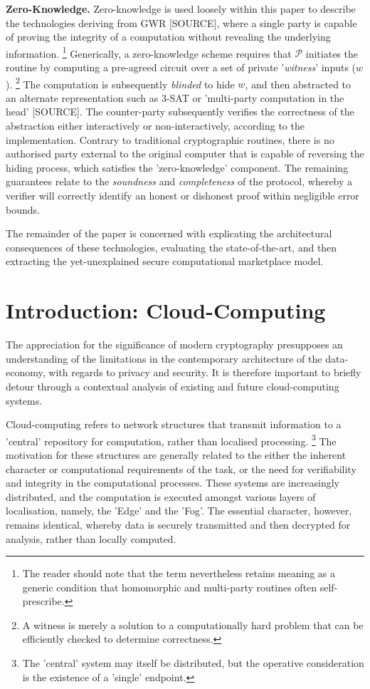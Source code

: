 \documentclass[twocolumn]{scrartcl}
\begin{document}
\textbf{Zero-Knowledge.} Zero-knowledge is used loosely within this paper to describe the technologies deriving from GWR [SOURCE], where a single party is capable of proving the integrity of a computation without revealing the underlying information. \footnote{The reader should note that the term nevertheless retains meaning as a generic condition that homomorphic and multi-party routines often self-prescribe.} Generically, a zero-knowledge scheme requires that $\mathcal{P}$ initiates the routine by computing a pre-agreed circuit over a set of private '\textit{witness}' inputs ($w$). \footnote{A witness is merely a solution to a computationally hard problem that can be efficiently checked to determine correctness.} The computation is subsequently \textit{blinded} to hide $w$, and then abstracted to an alternate representation such as 3-SAT or 'multi-party computation in the head' [SOURCE]. The counter-party subsequently verifies the correctness of the abstraction either interactively or non-interactively, according to the implementation. Contrary to traditional cryptographic routines, there is no authorised party external to the original computer that is capable of reversing the hiding process, which satisfies the 'zero-knowledge' component. The remaining guarantees relate to the \textit{soundness} and \textit{completeness} of the protocol, whereby a verifier will correctly identify an honest or dishonest proof within negligible error bounds.

The remainder of the paper is concerned with explicating the architectural consequences of these technologies, evaluating the state-of-the-art, and then extracting the yet-unexplained secure computational marketplace model.

\section{Introduction: Cloud-Computing}
The appreciation for the significance of modern cryptography presupposes an understanding of the limitations in the contemporary architecture of the data-economy, with regards to privacy and security. It is therefore important to briefly detour through a contextual analysis of existing and future cloud-computing systems.

Cloud-computing refers to network structures that transmit information to a 'central' repository for computation, rather than localised processing. \footnote{The 'central' system may itself be distributed, but the operative consideration is the existence of a 'single' endpoint.} The motivation for these structures are generally related to the either the inherent character or computational requirements of the task, or the need for verifiability and integrity in the computational processes. These systems are increasingly distributed, and the computation is executed amongst various layers of localisation, namely, the 'Edge' and the 'Fog'. The essential character, however, remains identical, whereby data is securely transmitted and then decrypted for analysis, rather than locally computed.
\end{document}
